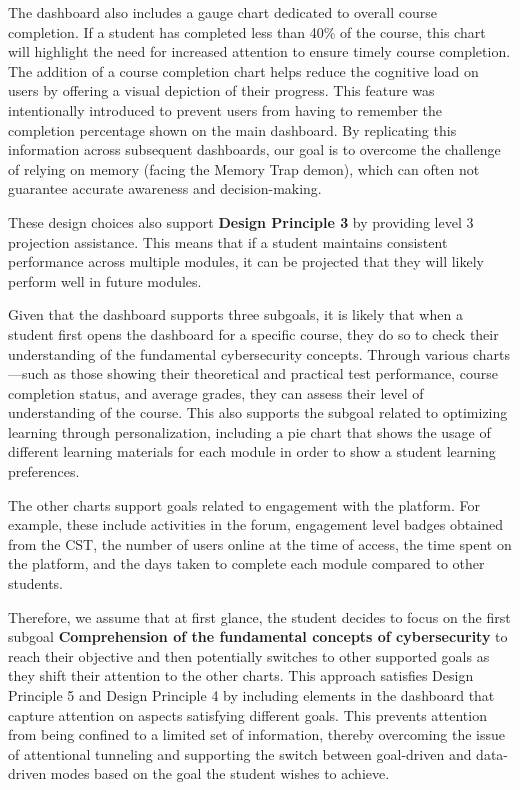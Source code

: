The dashboard also includes a gauge chart dedicated to overall course completion. If a student has completed less than 40\% of the course, this chart will highlight the need for increased attention to ensure timely course completion.
The addition of a course completion chart helps reduce the cognitive load on users by offering a visual depiction of their progress. This feature was intentionally introduced to prevent users from having to remember the completion percentage shown on the main dashboard. By replicating this information across subsequent dashboards, our goal is to overcome the challenge of relying on memory (facing the Memory Trap demon), which can often not guarantee accurate awareness and decision-making.

These design choices also support \textbf{Design Principle 3} by providing level 3 projection assistance. This means that if a student maintains consistent performance across multiple modules, it can be projected that they will likely perform well in future modules. 

Given that the dashboard supports three subgoals, it is likely that when a student first opens the dashboard for a specific course, they do so to check their understanding of the fundamental cybersecurity concepts. Through various charts—such as those showing their theoretical and practical test performance, course completion status, and average grades, they can assess their level of understanding of the course. 
This also supports the subgoal related to optimizing learning through personalization, including a pie chart that shows the usage of different learning materials for each module in order to show a student learning preferences. 

The other charts support goals related to engagement with the platform. For example, these include activities in the forum, engagement level badges obtained from the CST, the number of users online at the time of access, the time spent on the platform, and the days taken to complete each module compared to other students.

Therefore, we assume that at first glance, the student decides to focus on the first subgoal \textbf{Comprehension of the fundamental concepts of cybersecurity} to reach their objective and then potentially switches to other supported goals as they shift their attention to the other charts. This approach satisfies Design Principle 5 and Design Principle 4 by including elements in the dashboard that capture attention on aspects satisfying different goals. This prevents attention from being confined to a limited set of information, thereby overcoming the issue of attentional tunneling and supporting the switch between goal-driven and data-driven modes based on the goal the student wishes to achieve.


